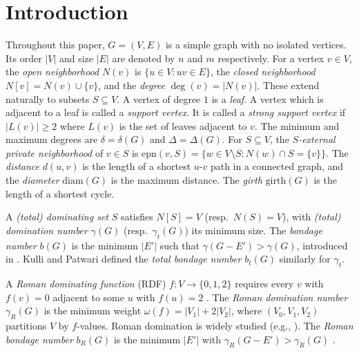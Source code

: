 \documentclass[12pt,reqno]{amsart}
\theoremstyle{plain}
\numberwithin{equation}{section}
\begin{document}
\maketitle

\setcounter{tocdepth}{1}


\section{Introduction}
Throughout this paper, $G=(V,E)$ is a simple graph with no isolated vertices. Its order $|V|$ and size $|E|$ are denoted by $n$ and $m$ respectively. For a vertex $v\in V$, the \textit{open neighborhood} $N(v)$ is $\{u\in V:uv\in E\}$, the \textit{closed neighborhood} $N[v]=N(v)\cup\{v\}$, and the \textit{degree} $\deg(v)=|N(v)|$. These extend naturally to subsets $S\subseteq V$. A vertex of degree $1$ is a \textit{leaf}.  A vertex which is adjacent to a leaf is called a \textit{support vertex}.  It is called a \textit{strong support vertex} if $|L(v)|\geq 2$ where $L(v)$ is the set of leaves adjacent to $v$. The minimum and maximum degrees are $\delta=\delta(G)$ and $\Delta=\Delta(G)$. For $S\subseteq V$, the \textit{$S$-external private neighborhood} of $v\in S$ is $\mathrm{epn}(v,S)=\{w\in V\setminus S:N(w)\cap S=\{v\}\}$. The \textit{distance} $d(u,v)$ is the length of a shortest $u$-$v$ path in a connected graph, and the \textit{diameter} $\mathrm{diam}(G)$ is the maximum distance. The \textit{girth} $\mathrm{girth}(G)$ is the length of a shortest cycle. 

A \textit{(total) dominating set} $S$ satisfies $N[S]=V$ (resp.\ $N(S)=V$), with \textit{(total) domination number} $\gamma(G)$ (resp.\ $\gamma_t(G)$) its minimum size. The \textit{bondage number} $b(G)$ is the minimum $|E'|$ such that $\gamma(G-E')>\gamma(G)$, introduced in \cite{refrefref}. Kulli and Patwari \cite{kul} defined the \textit{total bondage number} $b_t(G)$ similarly for $\gamma_t$.

A \textit{Roman dominating function} (RDF) $f:V\to\{0,1,2\}$ requires every $v$ with $f(v)=0$ adjacent to some $u$ with $f(u)=2$ \cite{rr,s}. The \textit{Roman domination number} $\gamma_R(G)$ is the minimum weight $\omega(f)=|V_1|+2|V_2|$, where $(V_0,V_1,V_2)$ partitions $V$ by $f$-values. Roman domination is widely studied (e.g., \cite{R1,Co,R2}). The \textit{Roman bondage number} $b_R(G)$ is the minimum $|E'|$ with $\gamma_R(G-E')>\gamma_R(G)$ \cite{rad}.
\end{document}
